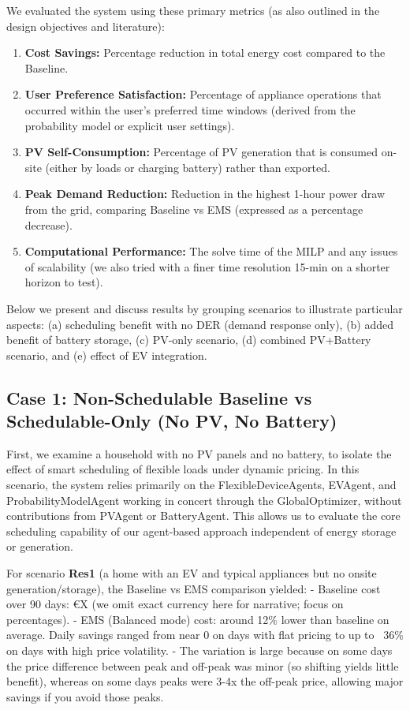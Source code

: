 \documentclass[12pt,a4paper]{article}
\begin{document}
We evaluated the system using these primary metrics (as also outlined in the design objectives and literature):
\begin{enumerate}
    \item \textbf{Cost Savings:} Percentage reduction in total energy cost compared to the Baseline.
    \item \textbf{User Preference Satisfaction:} Percentage of appliance operations that occurred within the user's preferred time windows (derived from the probability model or explicit user settings).
    \item \textbf{PV Self-Consumption:} Percentage of PV generation that is consumed on-site (either by loads or charging battery) rather than exported.
    \item \textbf{Peak Demand Reduction:} Reduction in the highest 1-hour power draw from the grid, comparing Baseline vs EMS (expressed as a percentage decrease).
    \item \textbf{Computational Performance:} The solve time of the MILP and any issues of scalability (we also tried with a finer time resolution 15-min on a shorter horizon to test).
\end{enumerate}
Below we present and discuss results by grouping scenarios to illustrate particular aspects: (a) scheduling benefit with no DER (demand response only), (b) added benefit of battery storage, (c) PV-only scenario, (d) combined PV+Battery scenario, and (e) effect of EV integration.

\subsection{Case 1: Non-Schedulable Baseline vs Schedulable-Only (No PV, No Battery)}
First, we examine a household with no PV panels and no battery, to isolate the effect of smart scheduling of flexible loads under dynamic pricing. In this scenario, the system relies primarily on the FlexibleDeviceAgents, EVAgent, and ProbabilityModelAgent working in concert through the GlobalOptimizer, without contributions from PVAgent or BatteryAgent. This allows us to evaluate the core scheduling capability of our agent-based approach independent of energy storage or generation.

For scenario \textbf{Res1} (a home with an EV and typical appliances but no onsite generation/storage), the Baseline vs EMS comparison yielded:
- Baseline cost over 90 days: €X (we omit exact currency here for narrative; focus on percentages).
- EMS (Balanced mode) cost: around 12\% lower than baseline on average. Daily savings ranged from near 0 on days with flat pricing to up to ~36\% on days with high price volatility.
- The variation is large because on some days the price difference between peak and off-peak was minor (so shifting yields little benefit), whereas on some days peaks were 3-4x the off-peak price, allowing major savings if you avoid those peaks.
\end{document}
